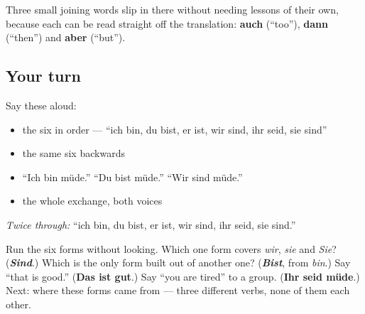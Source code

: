Three small joining words slip in there without needing lessons of their own, because each can be read straight off the translation: \textbf{auch} (\textquotedblleft{}too\textquotedblright{}), \textbf{dann} (\textquotedblleft{}then\textquotedblright{}) and \textbf{aber} (\textquotedblleft{}but\textquotedblright{}).

\subsection*{Your turn}
Say these aloud:

\begin{itemize}
\raggedright
  \item the six in order — \textquotedblleft{}ich bin, du bist, er ist, wir sind, ihr seid, sie sind\textquotedblright{}
  \item the same six backwards
  \item \textquotedblleft{}Ich bin müde.\textquotedblright{} \textquotedblleft{}Du bist müde.\textquotedblright{} \textquotedblleft{}Wir sind müde.\textquotedblright{}
  \item the whole exchange, both voices
\end{itemize}

\emph{Twice through:} \textquotedblleft{}ich bin, du bist, er ist, wir sind, ihr seid, sie sind.\textquotedblright{}

\begin{tcolorbox}[breakable,colback=teal!4,colframe=teal!35!black,title={Before you move on}]
Run the six forms without looking. Which one form covers \emph{wir}, \emph{sie} and \emph{Sie}? (\emph{\textbf{Sind}}.) Which is the only form built out of another one? (\emph{\textbf{Bist}}, from \emph{bin}.) Say \textquotedblleft{}that is good.\textquotedblright{} (\textbf{Das ist gut}.) Say \textquotedblleft{}you are tired\textquotedblright{} to a group. (\textbf{Ihr seid müde}.) Next: where these forms came from — three different verbs, none of them each other.
\end{tcolorbox}
